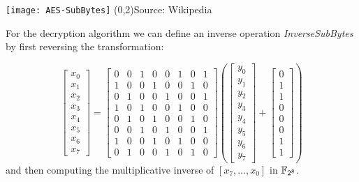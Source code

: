 
\begin{center}
  \texttt{[image: AES-SubBytes]}
  (0,2){\tiny Source: Wikipedia}%
\end{center}

For the decryption algorithm we can define an inverse operation
\textit{InverseSubBytes} by first reversing the transformation:

\[\begin{bmatrix}x_0\\x_1\\x_2\\x_3\\x_4\\x_5\\x_6\\x_7\end{bmatrix} =
\begin{bmatrix} 0&0&1&0&0&1&0&1\\ 1&0&0&1&0&0&1&0\\ 0&1&0&0&1&
0&0&1\\ 1&0&1&0&0&1&0&0\\ 0&1&0&1&0&0&1&0\\ 0&0&1&0&1&0&0&1\\ 
1&0&0&1&0&1&0&0\\ 0&1&0&0&1&0&1&0
\end{bmatrix}
\left(\begin{bmatrix}y_0\\y_1\\y_2\\y_3\\y_4\\y_5\\y_6\\y_7\end{bmatrix} +
  \begin{bmatrix}0\\1\\1\\0\\0\\0\\1\\1\end{bmatrix}\right) \] and then
computing the multiplicative inverse of $[x_7,\ldots, x_0]$ in ${ \mathbb{F}_{2^8}}$.


